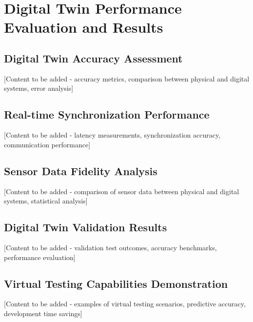 \vspace{21.5pt}
\chapter{Digital Twin Performance Evaluation and Results}

\section{Digital Twin Accuracy Assessment}

[Content to be added - accuracy metrics, comparison between physical and digital systems, error analysis]

\section{Real-time Synchronization Performance}

[Content to be added - latency measurements, synchronization accuracy, communication performance]

\section{Sensor Data Fidelity Analysis}

[Content to be added - comparison of sensor data between physical and digital systems, statistical analysis]

\section{Digital Twin Validation Results}

[Content to be added - validation test outcomes, accuracy benchmarks, performance evaluation]

\section{Virtual Testing Capabilities Demonstration}

[Content to be added - examples of virtual testing scenarios, predictive accuracy, development time savings]
